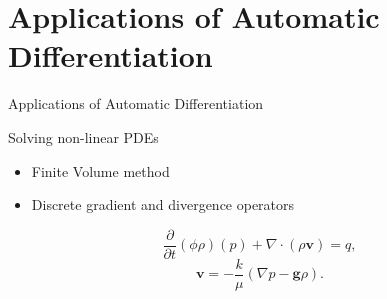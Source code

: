 \section{Applications of Automatic Differentiation}

\begin{frame}{Applications of Automatic Differentiation}
    \begin{block}{Solving non-linear PDEs}
        \begin{itemize}
            \item Finite Volume method
            \item Discrete gradient and divergence operators
        \end{itemize}
    \end{block}
        \begin{equation*}
        \frac{\partial}{\partial t}(\phi\rho)(p) + \nabla\cdot(\rho\textbf{v}) = q,
    \end{equation*}
    \begin{equation*}
        \textbf{v} = - \frac{k}{\mu}(\nabla p - \textbf{g}\rho).
        \label{eq:pressSolverDarcy}
    \end{equation*}
\end{frame}